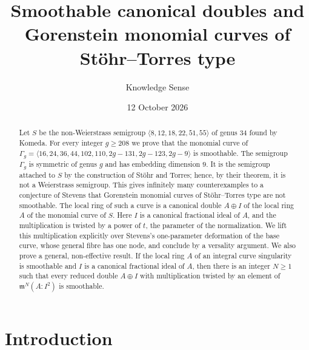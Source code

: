 \documentclass{amsart}
\theoremstyle{definition}
\theoremstyle{remark}
\numberwithin{equation}{section}
\newcommand{\m}{\mathfrak{m}}
\begin{document}
\title[Smoothable canonical doubles]{Smoothable canonical doubles and Gorenstein monomial curves of St\"ohr--Torres type}

\author{Knowledge Sense}
\address{Knowledge Sense}

\date{12 October 2026}



\begin{abstract}
Let $S$ be the non-Weierstrass semigroup $\langle 8,12,18,22,51,55\rangle$ of genus $34$ found by Komeda. For every integer $g\ge 208$ we prove that the monomial curve of $\Gamma_g=\langle 16,24,36,44,102,110,2g-131,2g-123,2g-9\rangle$ is smoothable. The semigroup $\Gamma_g$ is symmetric of genus $g$ and has embedding dimension $9$. It is the semigroup attached to $S$ by the construction of St\"ohr and Torres; hence, by their theorem, it is not a Weierstrass semigroup. This gives infinitely many counterexamples to a conjecture of Stevens that Gorenstein monomial curves of St\"ohr--Torres type are not smoothable. The local ring of such a curve is a canonical double $A\oplus I$ of the local ring $A$ of the monomial curve of $S$. Here $I$ is a canonical fractional ideal of $A$, and the multiplication is twisted by a power of $t$, the parameter of the normalization. We lift this multiplication explicitly over Stevens's one-parameter deformation of the base curve, whose general fibre has one node, and conclude by a versality argument. We also prove a general, non-effective result. If the local ring $A$ of an integral curve singularity is smoothable and $I$ is a canonical fractional ideal of $A$, then there is an integer $N\ge 1$ such that every reduced double $A\oplus I$ with multiplication twisted by an element of $\m^N(A:I^2)$ is smoothable.
\end{abstract}

\maketitle

\section{Introduction}
\end{document}
